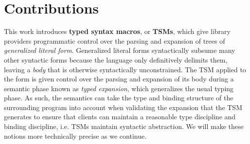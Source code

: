 





\section{Contributions}\label{sec:contributions}
This work introduces \textbf{typed syntax macros}, or \textbf{TSMs}, which give library providers programmatic control over the parsing and expansion of trees of \emph{generalized literal form}. Generalized literal forms syntactically subsume many other syntactic forms because the language only definitively delimits them, leaving a \emph{body} that is otherwise syntactically unconstrained. The TSM applied to the form is given control over the parsing and expansion of its body during a semantic phase known as \emph{typed expansion}, which generalizes the usual typing phase. As such, the semantics can take the type and binding structure of the surrounding program into account when validating the expansion that the TSM generates to ensure that clients can maintain a reasonable type discipline and binding discipline, i.e. TSMs maintain syntactic abstraction. %
We will make these notions more technically precise as we continue.

